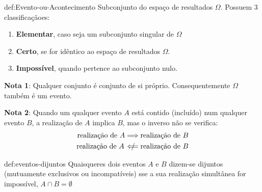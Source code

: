 
\begin{theo}{def:Evento-ou-Acontecimento}\label{def:evento}
    Subconjunto do espaço de resultados $\Omega$. Possuem 3 classificaçãoes:
    
    \vspace{-1 em}
    \begin{enumerate}[label=$\bullet$]
        \item \textbf{Elementar}, caso seja um subconjunto singular de $\Omega$
        \item \textbf{Certo}, se for idêntico ao espaço de resultados $\Omega$.
        \item \textbf{Impossível}, quando pertence ao subconjunto nulo.
    \end{enumerate}
    
    \noindent \textbf{Nota 1}: Qualquer conjunto é conjunto de si próprio. Consequentemente $\Omega$ também é um evento.

    \noindent \textbf{Nota 2}: Quando um qualquer evento $A$ está contido (incluído) num qualquer evento $B$, a realização de $A$ implica $B$, mas o inverso não se verifica:
    \begin{align*}
        \text{realização de $A$} \Longrightarrow \text{realização de $B$}\\ 
        \text{realização de $A$}\quad /\mkern-25mu\Longleftarrow \text{realização de $B$}
    \end{align*}
\end{theo}

\begin{theo}{def:eventos-dijuntos}\label{def:eventos-dis}
    Quaisqueres dois eventos $A$ e $B$ dizem-se dijuntos (mutuamente exclusivos ou incompatíveis) sse a sua realização simultânea for impossível, $A\cap B = \emptyset$
\end{theo}

